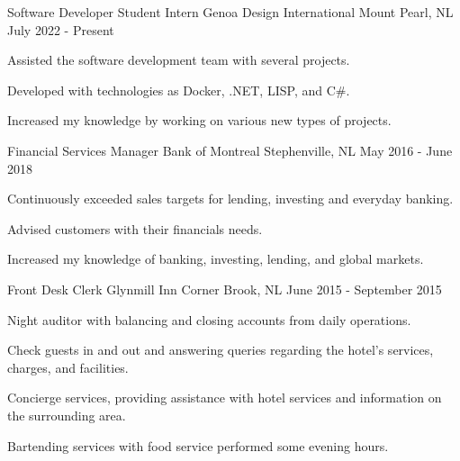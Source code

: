 

\begin{cventries}

  \cventry
    {Software Developer Student Intern} %
    {Genoa Design International} %
    {Mount Pearl, NL} %
    {July 2022 - Present} %
    {
      \begin{cvitems} %
        \item {Assisted the software development team with several projects.}
        \item {Developed with technologies as Docker, .NET, LISP, and C\#.}
        \item {Increased my knowledge by working on various new types of projects.}
      \end{cvitems}
    }

  \cventry
    {Financial Services Manager} %
    {Bank of Montreal} %
    {Stephenville, NL} %
    {May 2016 - June 2018} %
    {
      \begin{cvitems} %
        \item {Continuously exceeded sales targets for lending, investing and everyday banking.}
        \item {Advised customers with their financials needs.}
        \item {Increased my knowledge of banking, investing, lending, and global markets.}
      \end{cvitems}
    }

  \cventry
    {Front Desk Clerk} %
    {Glynmill Inn} %
    {Corner Brook, NL} %
    {June 2015 - September 2015} %
    {
      \begin{cvitems} %
        \item {Night auditor with balancing and closing accounts from daily operations.}
        \item {Check guests in and out and answering queries regarding the hotel's services, charges, and facilities.}
        \item {Concierge services, providing assistance with hotel services and information on the surrounding area.}
		\item {Bartending services with food service performed some evening hours.}
      \end{cvitems}
    }


\end{cventries}
